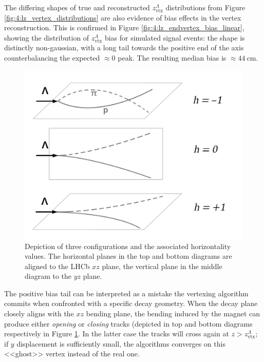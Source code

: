 The differing shapes of true and reconstructed $z_\text{vtx}^\Lambda$ distributions from Figure \ref{fig:4:lz_vertex_distributions} are also evidence of bias effects in the \lambdadecay vertex reconstruction.
This is confirmed in Figure \ref{fig:4:lz_endvertex_bias_linear}, showing the distribution of $z_\text{vtx}^\Lambda$ bias for simulated signal events:
the shape is distinctly non-gaussian, with a long tail towards the positive end of the axis counterbalancing the expected $\approx 0$ peak.
The resulting median bias is $\approx \SI{44}{\centi\meter}$.

\begin{figure}[t]
	\centering
	\includegraphics[width=.7\textwidth]{graphics/04-event_selection/horizontality_illustration_bw.png}
	\caption{Depiction of three \lambdadecay configurations and the associated horizontality values. The horizontal planes in the top and bottom diagrams are aligned to the LHCb $xz$ plane, the vertical plane in the middle diagram to the $yz$ plane.}
	\label{fig:4:horizontality_explanation}
\end{figure}

The positive bias tail can be interpreted as a mistake the vertexing algorithm commits when confronted with a specific decay geometry.
When the \lambdadecay decay plane closely aligns with the $xz$ bending plane, the bending induced by the magnet can produce either \textit{opening} or \textit{closing} tracks (depicted in top and bottom diagrams respectively in Figure \ref{fig:4:horizontality_explanation}.
In the latter case the tracks will cross again at $z>z_\text{vtx}^\Lambda$;
if $y$ displacement is sufficiently small, the algorithms converges on this <<ghost>> vertex instead of the real one.

